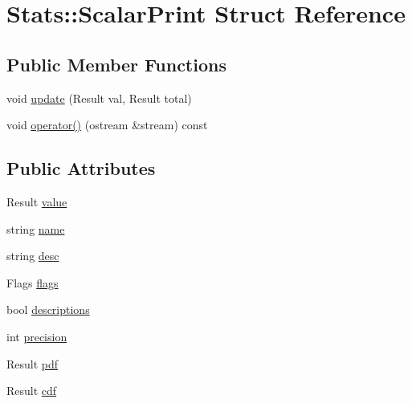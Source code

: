 \hypertarget{structStats_1_1ScalarPrint}{
\section{Stats::ScalarPrint Struct Reference}
\label{structStats_1_1ScalarPrint}
}
\subsection*{Public Member Functions}
\begin{DoxyCompactItemize}
\item 
void \hyperlink{structStats_1_1ScalarPrint_aa08fb14872273da3cfeb8400168294a8}{update} (Result val, Result total)
\item 
void \hyperlink{structStats_1_1ScalarPrint_aa2f17b2f3ee7c73b6ecff89c7a0dfdc1}{operator()} (ostream \&stream) const 
\end{DoxyCompactItemize}
\subsection*{Public Attributes}
\begin{DoxyCompactItemize}
\item 
Result \hyperlink{structStats_1_1ScalarPrint_a45fe47d5d3b39603727f5641c51ba4fd}{value}
\item 
string \hyperlink{structStats_1_1ScalarPrint_a5be372119c7d55a9d96688aaa060cc79}{name}
\item 
string \hyperlink{structStats_1_1ScalarPrint_a7489ca369b46014bdece1ecb9b90e097}{desc}
\item 
Flags \hyperlink{structStats_1_1ScalarPrint_a920e3f724dce9d9a24810a16ffacb4bb}{flags}
\item 
bool \hyperlink{structStats_1_1ScalarPrint_a738a9523ba5234d01d11127b1dc1eb8d}{descriptions}
\item 
int \hyperlink{structStats_1_1ScalarPrint_a879b6ff384c6685845e308118c0d82d3}{precision}
\item 
Result \hyperlink{structStats_1_1ScalarPrint_acd1df1a0346a2bd5dd90086550663eea}{pdf}
\item 
Result \hyperlink{structStats_1_1ScalarPrint_aeb6a7afaa0bf80f0d8629d9798afc2e3}{cdf}
\end{DoxyCompactItemize}


